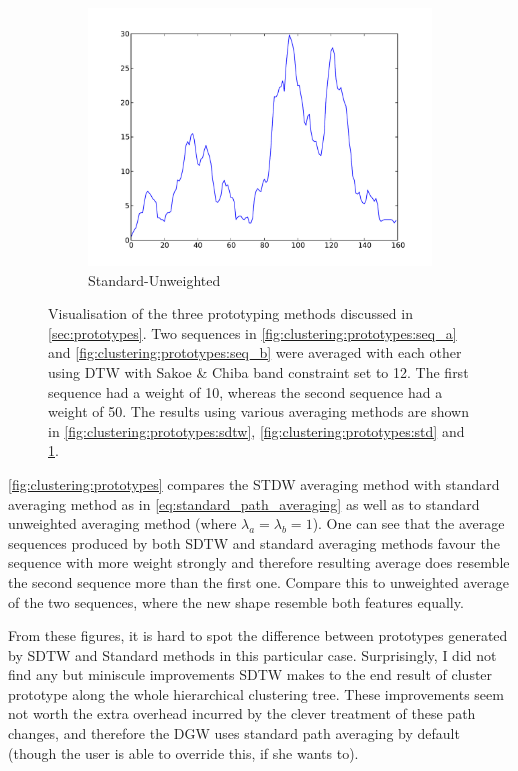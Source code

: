 \documentclass[parskip]{cs4rep}
\begin{document}
\begin{figure}
\begin{subfigure}[b]{0.31\textwidth}
        \includegraphics[width=\textwidth]{figures/clustering/prototypes/unweighted.pdf}
        \caption{Standard-Unweighted}
        \label{fig:clustering:prototypes:unweighted}
    \end{subfigure}
    \caption{Visualisation of the three prototyping methods discussed in \autoref{sec:prototypes}. Two sequences in \ref{fig:clustering:prototypes:seq_a} and \ref{fig:clustering:prototypes:seq_b} were averaged with each other using DTW with Sakoe & Chiba band constraint set to 12. The first sequence had a weight of 10, whereas the second sequence had a weight of 50. The results using various averaging methods are shown in \ref{fig:clustering:prototypes:sdtw}, \ref{fig:clustering:prototypes:std} and \ref{fig:clustering:prototypes:unweighted}.}
    \label{fig:clustering:prototypes}
\end{figure}

\autoref{fig:clustering:prototypes} compares the STDW averaging method with standard averaging method as in \autoref{eq:standard_path_averaging} as well as to standard unweighted averaging method (where $\lambda_a = \lambda_b = 1$). One can see that the average sequences produced by both SDTW and standard averaging methods favour the sequence with more weight strongly and therefore resulting average does resemble the second sequence more than the first one. Compare this to unweighted average of the two sequences, where the new shape resemble both features equally. 

From these figures, it is hard to spot the difference between prototypes generated by SDTW and Standard methods in this particular case. Surprisingly, I did not find any but miniscule improvements SDTW makes to the end result of cluster prototype along the whole hierarchical clustering tree. These improvements seem not worth the extra overhead incurred by the clever treatment of these path changes, and therefore the DGW uses standard path averaging by default (though the user is able to override this, if she wants to).
\end{document}
